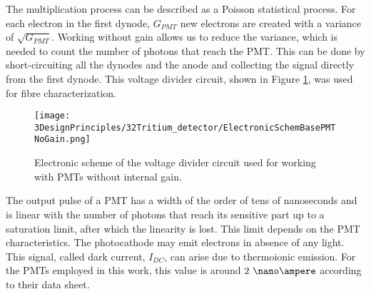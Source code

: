 \begin{enumerate}
The multiplication process can be described as a Poisson statistical process. For each electron in the first dynode, $G_{PMT}$ new electrons are created with a variance of $\sqrt{G_{PMT}}$. Working without gain allows us to reduce the variance, which is needed to count the number of photons that reach the PMT. This can be done by short-circuiting all the dynodes and the anode and collecting the signal directly from the first dynode. This voltage divider circuit, shown in Figure \ref{fig:ElectronicSchemeBasePMTNoGain}, was used for fibre characterization.

\begin{figure}[htbp]
\centering
\texttt{[image: 3DesignPrinciples/32Tritium\_detector/ElectronicSchemBasePMTNoGain.png]}
\caption{Electronic scheme of the voltage divider circuit used for working with PMTs without internal gain.\label{fig:ElectronicSchemeBasePMTNoGain}}
\end{figure}


\end{enumerate}

The output pulse of a PMT has a width of the order of tens of nanoseconds and is linear with the number of photons that reach its sensitive part up to a saturation limit, after which the linearity is lost. This limit depends on the PMT characteristics. The photocathode may emit electrons in absence of any light. This signal, called dark current, $I_{DC}$, can  arise due to thermoionic emission. For the PMTs employed in this work, this value is around $2~\nano\ampere$ according to their data sheet.

